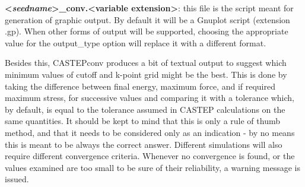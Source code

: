 \documentclass[10pt]{article}
\begin{document}
\textbf{\textless \textit{seedname}\textgreater\_conv.\textless variable extension\textgreater}: this file is the script meant for generation of graphic output. By default it will be a Gnuplot script (extension .gp). When other forms of output will be supported, choosing the appropriate value for the output\_type option will replace it with a different format.

Besides this, CASTEPconv produces a bit of textual output to suggest which minimum values of cutoff and k-point grid might be the best. This is done by taking the difference between final energy, maximum force, and if required maximum stress, for successive values and comparing it with a tolerance which, by default, is equal to the tolerance assumed in CASTEP calculations on the same quantities. It should be kept to mind that this is only a rule of thumb method, and that it needs to be considered only as an indication - by no means this is meant to be always the correct answer. Different simulations will also require different convergence criteria. Whenever no convergence is found, or the values examined are too small to be sure of their reliability, a warning message is issued.
\end{document}
